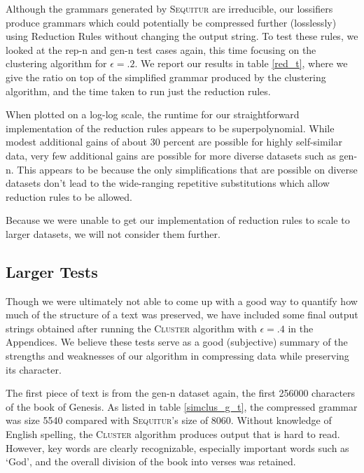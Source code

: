 \documentclass[11pt]{article}
\newcommand{\Sequitur}{\textsc{Sequitur}\xspace}
\newcommand{\Cluster}{\textsc{Cluster}\xspace}
\begin{document}
Although the grammars generated by \Sequitur are irreducible, our lossifiers
produce grammars which could potentially be compressed further (losslessly)
using Reduction Rules without changing the output string. To test these rules,
we looked at the rep-n and gen-n test cases again, this time focusing on the
clustering algorithm for $\epsilon = .2$. We report our results in table
\ref{red_t}, where we give the ratio on top of the simplified grammar produced
by the clustering algorithm, and the time taken to run just the reduction
rules.

When plotted on a log-log scale, the runtime for our straightforward
implementation of the reduction rules appears to be superpolynomial. While
modest additional gains of about 30 percent are possible for highly
self-similar data, very few additional gains are possible for more diverse
datasets such as gen-n. This appears to be because the only simplifications
that are possible on diverse datasets don't lead to the wide-ranging repetitive
substitutions which allow reduction rules to be allowed.

Because we were unable to get our implementation of reduction rules to scale to
larger datasets, we will not consider them further.

\subsection{Larger Tests}

Though we were ultimately not able to come up with a good way to quantify how
much of the structure of a text was preserved, we have included some final
output strings obtained after running the \Cluster algorithm with $\epsilon =
.4$ in the Appendices. We believe these tests serve as a good (subjective)
summary of the strengths and weaknesses of our algorithm in compressing data
while preserving its character.

The first piece of text is from the gen-n dataset again, the first 256000
characters of the book of Genesis. As listed in table \ref{simclus_g_t}, the
compressed grammar was size 5540 compared with \Sequitur's size of 8060.
Without knowledge of English spelling, the \Cluster algorithm produces output
that is hard to read. However, key words are clearly recognizable, especially
important words such as `God', and the overall division of the book into verses
was retained.
\end{document}
